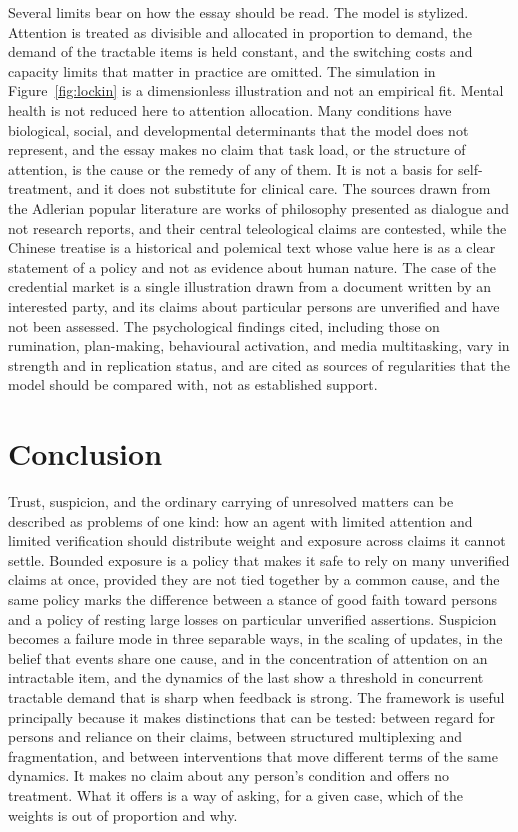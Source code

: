 \documentclass[11pt]{article}
\theoremstyle{definition}
\begin{document}
Several limits bear on how the essay should be read. The model is stylized. Attention is treated as divisible and allocated in proportion to demand, the demand of the tractable items is held constant, and the switching costs and capacity limits that matter in practice are omitted. The simulation in Figure~\ref{fig:lockin} is a dimensionless illustration and not an empirical fit. Mental health is not reduced here to attention allocation. Many conditions have biological, social, and developmental determinants that the model does not represent, and the essay makes no claim that task load, or the structure of attention, is the cause or the remedy of any of them. It is not a basis for self-treatment, and it does not substitute for clinical care. The sources drawn from the Adlerian popular literature are works of philosophy presented as dialogue and not research reports, and their central teleological claims are contested, while the Chinese treatise is a historical and polemical text whose value here is as a clear statement of a policy and not as evidence about human nature. The case of the credential market is a single illustration drawn from a document written by an interested party, and its claims about particular persons are unverified and have not been assessed. The psychological findings cited, including those on rumination, plan-making, behavioural activation, and media multitasking, vary in strength and in replication status, and are cited as sources of regularities that the model should be compared with, not as established support.

\section{Conclusion}

Trust, suspicion, and the ordinary carrying of unresolved matters can be described as problems of one kind: how an agent with limited attention and limited verification should distribute weight and exposure across claims it cannot settle. Bounded exposure is a policy that makes it safe to rely on many unverified claims at once, provided they are not tied together by a common cause, and the same policy marks the difference between a stance of good faith toward persons and a policy of resting large losses on particular unverified assertions. Suspicion becomes a failure mode in three separable ways, in the scaling of updates, in the belief that events share one cause, and in the concentration of attention on an intractable item, and the dynamics of the last show a threshold in concurrent tractable demand that is sharp when feedback is strong. The framework is useful principally because it makes distinctions that can be tested: between regard for persons and reliance on their claims, between structured multiplexing and fragmentation, and between interventions that move different terms of the same dynamics. It makes no claim about any person's condition and offers no treatment. What it offers is a way of asking, for a given case, which of the weights is out of proportion and why.
\end{document}
